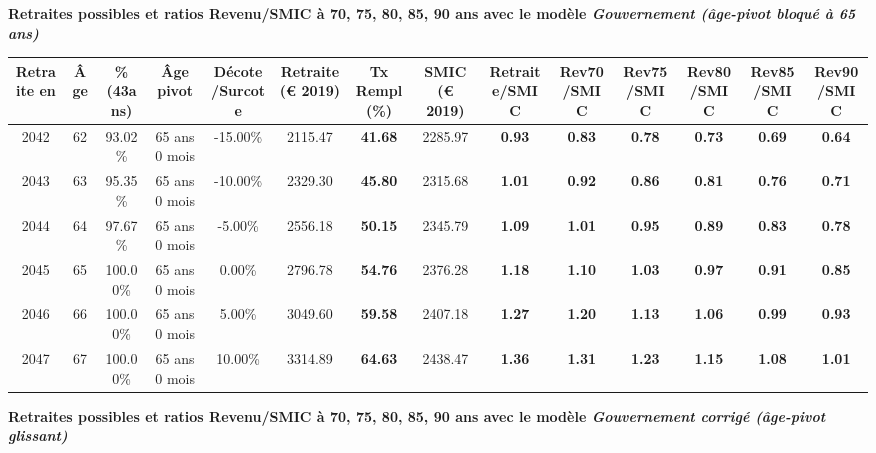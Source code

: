 {\bf \noindent Retraites possibles et ratios Revenu/SMIC à 70, 75, 80, 85, 90 ans avec le modèle \emph{Gouvernement (âge-pivot bloqué à 65 ans)}}  
 
\begin{adjustbox}{max width=\textwidth} 
\begin{tabular}[htb]{|c|c||c|c|c||c|c||c||c|c|c|c|c|c|} 
\hline 
 Retraite en &  Âge &  \%(43ans) &  Âge pivot &  Décote/Surcote &  Retraite (\euro{} 2019) &  Tx Rempl(\%) &  SMIC (\euro{} 2019) &  Retraite/SMIC &  Rev70/SMIC &  Rev75/SMIC &  Rev80/SMIC &  Rev85/SMIC &  Rev90/SMIC \\ 
\hline \hline 
 2042 &  62 &  93.02\% &  65 ans 0 mois &  -15.00\% &  2115.47 &  {\bf 41.68} &  2285.97 &  {\bf {\color{red} 0.93}} &  {\bf {\color{red} 0.83}} &  {\bf {\color{red} 0.78}} &  {\bf {\color{red} 0.73}} &  {\bf {\color{red} 0.69}} &  {\bf {\color{red} 0.64}} \\ 
\hline 
 2043 &  63 &  95.35\% &  65 ans 0 mois &  -10.00\% &  2329.30 &  {\bf 45.80} &  2315.68 &  {\bf 1.01} &  {\bf {\color{red} 0.92}} &  {\bf {\color{red} 0.86}} &  {\bf {\color{red} 0.81}} &  {\bf {\color{red} 0.76}} &  {\bf {\color{red} 0.71}} \\ 
\hline 
 2044 &  64 &  97.67\% &  65 ans 0 mois &  -5.00\% &  2556.18 &  {\bf 50.15} &  2345.79 &  {\bf 1.09} &  {\bf 1.01} &  {\bf {\color{red} 0.95}} &  {\bf {\color{red} 0.89}} &  {\bf {\color{red} 0.83}} &  {\bf {\color{red} 0.78}} \\ 
\hline 
 2045 &  65 &  100.00\% &  65 ans 0 mois &  0.00\% &  2796.78 &  {\bf 54.76} &  2376.28 &  {\bf 1.18} &  {\bf 1.10} &  {\bf 1.03} &  {\bf {\color{red} 0.97}} &  {\bf {\color{red} 0.91}} &  {\bf {\color{red} 0.85}} \\ 
\hline 
 2046 &  66 &  100.00\% &  65 ans 0 mois &  5.00\% &  3049.60 &  {\bf 59.58} &  2407.18 &  {\bf 1.27} &  {\bf 1.20} &  {\bf 1.13} &  {\bf 1.06} &  {\bf {\color{red} 0.99}} &  {\bf {\color{red} 0.93}} \\ 
\hline 
 2047 &  67 &  100.00\% &  65 ans 0 mois &  10.00\% &  3314.89 &  {\bf 64.63} &  2438.47 &  {\bf 1.36} &  {\bf 1.31} &  {\bf 1.23} &  {\bf 1.15} &  {\bf 1.08} &  {\bf 1.01} \\ 
\hline 
\hline 
\end{tabular} 
\end{adjustbox} 
 
 \vspace{0.1cm} 
{\bf \noindent Retraites possibles et ratios Revenu/SMIC à 70, 75, 80, 85, 90 ans avec le modèle \emph{Gouvernement corrigé (âge-pivot glissant)}}  
 
